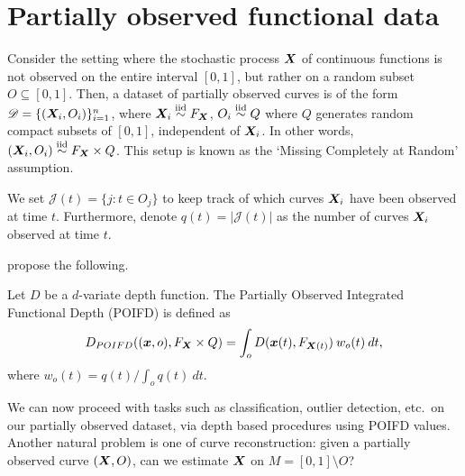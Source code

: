 \section{Partially observed functional data}

Consider the setting where the stochastic process $\bm{X}$ of continuous
functions is not observed on the entire interval $[0, 1]$, but rather on a
random subset $O \subseteq [0, 1]$.
Then, a dataset of partially observed curves is of the form $\mathscr{D} =
\{(\bm{X}_i, O_i)\}_{i = 1}^n$, where $\bm{X}_i \overset{\text{iid}}{\sim} F_{\bm{X}}$, $O_i \overset{\text{iid}}{\sim} Q$ where
$Q$ generates random compact subsets of $[0, 1]$, independent of $\bm{X}_i$.
In other words, $(\bm{X}_i, O_i) \overset{\text{iid}}{\sim} F_{\bm{X}} \times Q$.
This setup is known as the `Missing Completely at Random' assumption.

We set $\mathscr{J}(t) = \{j\colon t \in O_j\}$ to keep track of which curves
$\bm{X}_i$ have been observed at time $t$.
Furthermore, denote $q(t) = |\mathscr{J}(t)|$ as the number of curves $\bm{X}_i$
observed at time $t$.

\textcite{elias-jimenez-paganoni-sangalli-2023} propose the following.

\begin{definition}
    Let $D$ be a $d$-variate depth function.
    The Partially Observed Integrated Functional Depth (POIFD) is defined as
    \begin{equation}
        D_{POIFD}((\bm{x}, o), F_{\bm{X}} \times Q) = \int_o D(\bm{x}(t), F_{\bm{X}(t)})\:w_o(t) \:dt,
    \end{equation}
    where $w_o(t) = q(t) / \int_o q(t)\:dt$.
\end{definition}

We can now proceed with tasks such as classification, outlier detection, etc.\
on our partially observed dataset, via depth based procedures using POIFD
values.
Another natural problem is one of curve reconstruction: given a partially
observed curve $(\bm{X}, O)$, can we estimate $\bm{X}$ on $M = [0, 1]\setminus O$?
